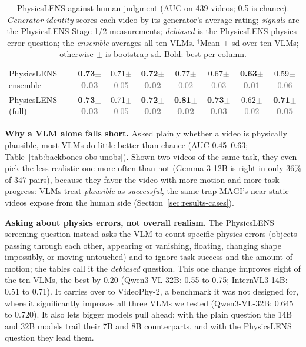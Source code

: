 \begin{table}[t]
\begin{tabular}{@{}lccccccc@{}}
        \midrule
        PhysicsLENS ensemble & \textbf{0.73{\scriptsize\textcolor{gray}{$\pm$0.03}}} & 0.71{\scriptsize\textcolor{gray}{$\pm$0.05}} & \textbf{0.72{\scriptsize\textcolor{gray}{$\pm$0.02}}} & 0.77{\scriptsize\textcolor{gray}{$\pm$0.02}} & 0.67{\scriptsize\textcolor{gray}{$\pm$0.03}} & \textbf{0.63{\scriptsize\textcolor{gray}{$\pm$0.01}}} & 0.59{\scriptsize\textcolor{gray}{$\pm$0.06}} \\
        \rowcolor{blue!6}PhysicsLENS (full) & \textbf{0.73{\scriptsize\textcolor{gray}{$\pm$0.03}}} & 0.71{\scriptsize\textcolor{gray}{$\pm$0.05}} & \textbf{0.72{\scriptsize\textcolor{gray}{$\pm$0.02}}} & \textbf{0.81{\scriptsize\textcolor{gray}{$\pm$0.02}}} & \textbf{0.73{\scriptsize\textcolor{gray}{$\pm$0.03}}} & 0.62{\scriptsize\textcolor{gray}{$\pm$0.02}} & \textbf{0.71{\scriptsize\textcolor{gray}{$\pm$0.05}}} \\
        \bottomrule
    \end{tabular}
    \caption{PhysicsLENS against human judgment (AUC on 439 videos; 0.5 is chance). \emph{Generator identity} scores each video by its generator's average rating; \emph{signals} are the PhysicsLENS Stage-1/2 measurements; \emph{debiased} is the PhysicsLENS physics-error question; the \emph{ensemble} averages all ten VLMs. $^\dagger$Mean $\pm$ sd over ten VLMs; otherwise $\pm$ is bootstrap sd. Bold: best per column.}
    \label{tab:main-results}
\end{table}

\textbf{Why a VLM alone falls short.} Asked plainly whether a video is physically plausible, most VLMs do little better than chance (AUC 0.45--0.63; Table~\ref{tab:backbones-obs-unobs}). Shown two videos of the same task, they even pick the less realistic one more often than not (Gemma-3-12B is right in only 36\% of 347 pairs), because they favor the video with more motion and more task progress: VLMs treat \emph{plausible} as \emph{successful}, the same trap MAGI's near-static videos expose from the human side (Section~\ref{sec:results-cases}).

\textbf{Asking about physics errors, not overall realism.} The PhysicsLENS screening question instead asks the VLM to count specific physics errors (objects passing through each other, appearing or vanishing, floating, changing shape impossibly, or moving untouched) and to ignore task success and the amount of motion; the tables call it the \emph{debiased} question. This one change improves eight of the ten VLMs, the best by 0.20 (Qwen3-VL-32B: 0.55 to 0.75; InternVL3-14B: 0.51 to 0.71). It carries over to VideoPhy-2, a benchmark it was not designed for, where it significantly improves all three VLMs we tested (Qwen3-VL-32B: 0.645 to 0.720). It also lets bigger models pull ahead: with the plain question the 14B and 32B models trail their 7B and 8B counterparts, and with the PhysicsLENS question they lead them.

